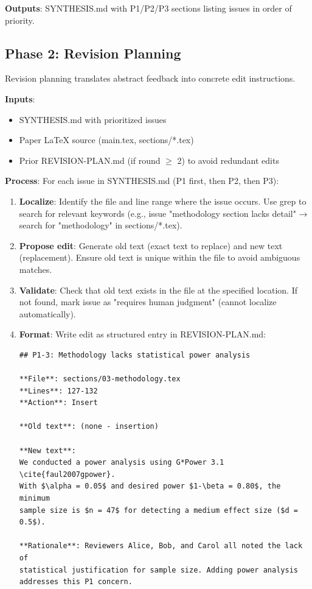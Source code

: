 \textbf{Outputs}: SYNTHESIS.md with P1/P2/P3 sections listing issues in order of priority.

\subsection{Phase 2: Revision Planning}

Revision planning translates abstract feedback into concrete edit instructions.

\textbf{Inputs}:
\begin{itemize}
\item SYNTHESIS.md with prioritized issues
\item Paper LaTeX source (main.tex, sections/*.tex)
\item Prior REVISION-PLAN.md (if round $\geq$ 2) to avoid redundant edits
\end{itemize}

\textbf{Process}: For each issue in SYNTHESIS.md (P1 first, then P2, then P3):
\begin{enumerate}
\item \textbf{Localize}: Identify the file and line range where the issue occurs. Use grep to search for relevant keywords (e.g., issue "methodology section lacks detail" → search for "methodology" in sections/*.tex).

\item \textbf{Propose edit}: Generate old text (exact text to replace) and new text (replacement). Ensure old text is unique within the file to avoid ambiguous matches.

\item \textbf{Validate}: Check that old text exists in the file at the specified location. If not found, mark issue as "requires human judgment" (cannot localize automatically).

\item \textbf{Format}: Write edit as structured entry in REVISION-PLAN.md:
\begin{verbatim}
## P1-3: Methodology lacks statistical power analysis

**File**: sections/03-methodology.tex
**Lines**: 127-132
**Action**: Insert

**Old text**: (none - insertion)

**New text**:
We conducted a power analysis using G*Power 3.1 \cite{faul2007gpower}.
With $\alpha = 0.05$ and desired power $1-\beta = 0.80$, the minimum
sample size is $n = 47$ for detecting a medium effect size ($d = 0.5$).

**Rationale**: Reviewers Alice, Bob, and Carol all noted the lack of
statistical justification for sample size. Adding power analysis
addresses this P1 concern.
\end{verbatim}
\end{enumerate}


